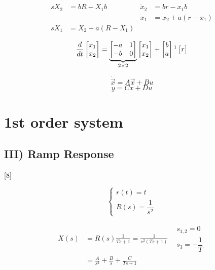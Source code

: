 \documentclass[11pt,a4paper]{article}
\begin{document}
\begin{align*}
sX_2&=bR-X_1b & \dot{x}_2&=br-x_1b\\
& & \dot{x}_1&=x_2+a(r-x_1)\\
sX_1&=X_2+a(R-X_1)
\end{align*}

\[
\frac{d}{dt}\begin{bmatrix}x_1\\x_2\end{bmatrix}
=
\underbrace{\begin{bmatrix}-a&1\\-b&0\end{bmatrix}}_{2\times2}
\begin{bmatrix}x_1\\x_2\end{bmatrix}
+
\begin{bmatrix}b\\a\end{bmatrix}\footnotemark
\begin{bmatrix}r\end{bmatrix}
\]

\[
\dot{\vec{x}}=A\vec{x}+Bu
\]
\[
y=Cx+Du
\]

\section{1st order system}
\subsection{III) Ramp Response}
[8]

\[
\left\{\begin{array}{l}r(t)=t\\ R(s)=\dfrac{1}{s^2}\end{array}\right.
\]

\begin{align*}
X(s)&=R(s)\frac{1}{Ts+1}=\frac{1}{s^2(Ts+1)} & \begin{array}{l}s_{1,2}=0\\ s_3=-\dfrac{1}{T}\end{array}\\
&=\frac{A}{s^2}+\frac{B}{s}+\frac{C}{Ts+1}
\end{align*}
\end{document}
